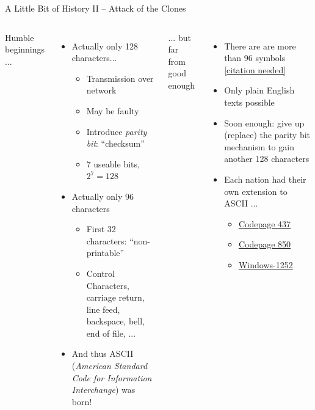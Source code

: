 \begin{frame}{A Little Bit of History II -- Attack of the Clones}
%
\begin{columns}[t]
Humble beginnings ...
\begin{itemize}
\item Actually only 128 characters...
	\begin{itemize}
	\item Transmission over network
	\item May be faulty
	\item Introduce \emph{parity bit}: \enquote{checksum}
	\item[\Thus] 7 useable bits, $2^7 = 128$
	\end{itemize}
\item Actually only 96 characters
	\begin{itemize}
	\item First 32 characters: \enquote{non-printable}
	\item Control Characters, \eg carriage return, line feed, backspace, bell, end of file, ...
	\end{itemize}
\item[\Thus] And thus ASCII (\emph{American Standard Code for Information Interchange}) was born!
\end{itemize}
%
... but far from good enough
\begin{itemize}
\item There are are more than 96 symbols {\color{blue} \href{https://xkcd.com/285/}{[citation needed]}}
\item Only plain English texts possible
\item Soon enough: give up (replace) the parity bit mechanism to gain another 128 characters
\item[\Thus] Each nation had their own extension to ASCII ...
	\begin{itemize}
	\item {\color{blue} \href{https://en.wikipedia.org/wiki/Code_page_437}{Codepage 437}}
	\item {\color{blue} \href{https://en.wikipedia.org/wiki/Code_page_850}{Codepage 850}}
	\item {\color{blue} \href{https://en.wikipedia.org/wiki/Windows-1252}{Windows-1252}}
	\end{itemize}
\end{itemize}
\end{columns}
%
\end{frame}

